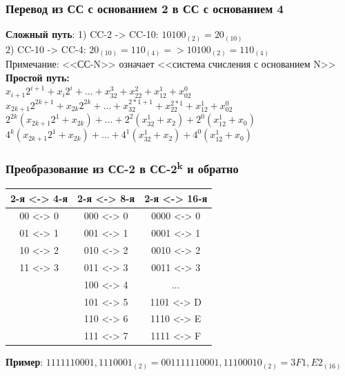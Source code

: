 \documentclass{beamer}
\begin{document}
\begin{frame}
\frametitle{Перевод из СС с основанием 2 в СС с основанием 4}
\textbf{Сложный путь}: 1) CC-2 -> CC-10: $10100_{(2)} = 20_{(10)}$\\
2) CC-10 -> CC-4: $20_{(10)} = 110_{(4)} => 10100_{(2)} = 110_{(4)}$\\
{\small Примечание: <<СС-N>> означает <<система счисления с основанием N>>}
\\ \hspace{\textwidth}
\bfseries{Простой путь}:\\
$x_{i+1}2^{i+1} + x_i2^i + \ldots + x_32^3 + x_22^2 + x_12^1 + x_02^0$\\
{
$x_{2k+1}2^{2k+1} + x_{2k}2^{2k} + \ldots + x_32^{2*1+1} + x_22^{2*1} + x_12^1 + x_02^0$\\
$2^{2k}(x_{2k+1}2^1 + x_{2k}) + \ldots + 2^2(x_32^1 + x_2) + 2^0(x_12^1 + x_0)$\\
$4^k(x_{2k+1}2^1 + x_{2k}) + \ldots + 4^1(x_32^1 + x_2) + 4^0(x_12^1 + x_0)$\\}
\vspace{3em}
\end{frame}

\begin{frame}
\frametitle{Преобразование из СС-2 в СС-2\textsuperscript{k} и обратно}
\begin{table}[]
\begin{tabular}{|c|c|c|}
\hline
\textbf{2-я <-> 4-я} & \textbf{2-я <-> 8-я} & \textbf{2-я <-> 16-я} \\ \hline
00 <-> 0 & 000 <-> 0 & 0000 <-> 0 \\ \hline
01 <-> 1 & 001 <-> 1 & 0001 <-> 1 \\ \hline
10 <-> 2 & 010 <-> 2 & 0010 <-> 2 \\ \hline
11 <-> 3 & 011 <-> 3 & 0011 <-> 3 \\ \hline
         & 100 <-> 4 & ... \\ \hline
         & 101 <-> 5 & 1101 <-> D \\ \hline
         & 110 <-> 6 & 1110 <-> E \\ \hline
         & 111 <-> 7 & 1111 <-> F \\ \hline
\end{tabular}
\end{table}

\textbf{Пример}: $1111110001,1110001_{(2)} = 0011 1111 0001,1110 0010_{(2)} = 3F1,E2_{(16)}$
\vspace{3em}
\end{frame}
\end{document}
